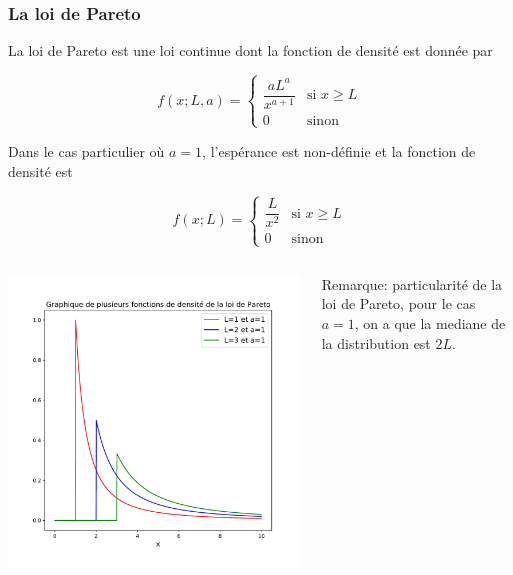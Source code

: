 \documentclass[8pt,sans,aspectratio=169]{beamer}
\begin{document}
\begin{frame}
\frametitle{La loi de Pareto}
La loi de Pareto est une loi continue dont la fonction de densité est donnée par

$$f(x;L,a)=\left\{
\begin{array}{ll}
\dfrac{aL^a}{x^{a+1}} & \text{si $x\geq L$}\\
0                       & \text{sinon}
\end{array}
\right.
$$

\pause

Dans le cas particulier où $a=1$, l'espérance est non-définie et la fonction de densité est 

$$f(x;L)=\left\{
\begin{array}{ll}
\dfrac{L}{x^{2}} & \text{si $x\geq L$}\\
0                       & \text{sinon}
\end{array}
\right.
$$


\vspace*{-0.3cm}
\begin{columns}[T]

\begin{column}{0.5\linewidth}

\includegraphics[scale=0.25]{graphiques_Pareto.pdf}

\end{column}

\pause
\begin{column}{0.5\linewidth}

\vspace*{2cm}
Remarque: particularité de la loi de Pareto, pour le cas $a=1$, on a que la mediane de la distribution est $2L.$

\end{column}

\end{columns}

\end{frame}
\end{document}
